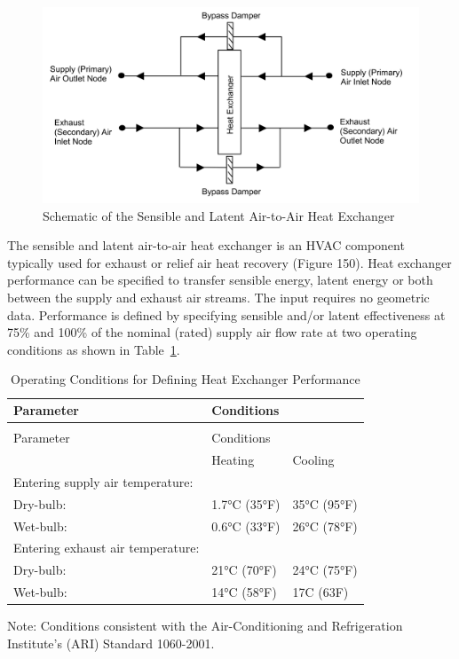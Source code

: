 \begin{figure}[htbp]
\centering
\includegraphics{media/image423.png}
\caption{Schematic of the Sensible and Latent Air-to-Air Heat Exchanger}
\end{figure}

The sensible and latent air-to-air heat exchanger is an HVAC component typically used for exhaust or relief air heat recovery (Figure 150). Heat exchanger performance can be specified to transfer sensible energy, latent energy or both between the supply and exhaust air streams. The input requires no geometric data. Performance is defined by specifying sensible and/or latent effectiveness at 75\% and 100\% of the nominal (rated) supply air flow rate at two operating conditions as shown in Table~\ref{table:operating-conditions-for-defining-heat}.

\begin{longtable}[c]{@{}lll@{}}
\caption{Operating Conditions for Defining Heat Exchanger Performance \label{table:operating-conditions-for-defining-heat}} \tabularnewline
\toprule
Parameter & Conditions & \tabularnewline
\midrule
\endfirsthead

\caption[]{Operating Conditions for Defining Heat Exchanger Performance} \tabularnewline
\toprule
Parameter & Conditions & \tabularnewline
\midrule
\endhead

& Heating & Cooling \tabularnewline
Entering supply air temperature: &  &  \tabularnewline
Dry-bulb: & 1.7°C (35°F) & 35°C (95°F) \tabularnewline
Wet-bulb: & 0.6°C (33°F) & 26°C (78°F) \tabularnewline
Entering exhaust air temperature: &  &  \tabularnewline
Dry-bulb: & 21°C (70°F) & 24°C (75°F) \tabularnewline
Wet-bulb: & 14°C (58°F) & 17C (63F) \tabularnewline
\bottomrule
\end{longtable}

Note: Conditions consistent with the Air-Conditioning and Refrigeration Institute's (ARI) Standard 1060-2001.

